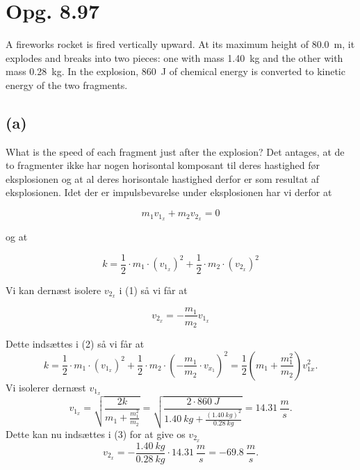 \documentclass[12pt]{article}
\begin{document}
\section*{Opg. 8.97}
A fireworks rocket is fired vertically upward. At its maximum height of \qty{80,0}{m}, it explodes and breaks into two pieces: one with mass \qty{1,40}{kg} and the other with mass \qty{0,28}{kg}. In the explosion, \qty{860}{J} of chemical energy is converted to kinetic energy of the two fragments.

\subsection*{(a)}
What is the speed of each fragment just after the explosion?
\bigbreak
Det antages, at de to fragmenter ikke har nogen horisontal komposant til deres hastighed før eksplosionen og at al deres horisontale hastighed derfor er som resultat af eksplosionen. Idet der er impulsbevarelse under eksplosionen har vi derfor at

\begin{equation}
m_1 v_{1_x} + m_2 v_{2_x} = 0
\end{equation}

og at

\begin{equation}
k = \frac{1}{2} \cdot m_1 \cdot \left( v_{1_x} \right)^2 + \frac{1}{2} \cdot m_2 \cdot \left( v_{2_x} \right)^2   
\end{equation}

Vi kan dernæst isolere $v_{2_x}$ i (1) så vi får at

\begin{equation}
v_{2_x} = -\frac{m_1}{m_2}v_{1_x}
\end{equation}

  Dette indsættes i (2) så vi får at
\[
k = \frac{1}{2} \cdot m_1 \cdot \left( v_{1_x} \right)^2 + \frac{1}{2} \cdot m_2 \cdot \left( -\frac{m_1}{m_2}\cdot v_{x_1} \right)^2  = \frac{1}{2}\left( m_1 + \frac{m_1^2}{m_2} \right) v_{1x}^2
.\] 
Vi isolerer dernæst $v_{1_x}$
\[
  v_{1_x} = \sqrt{\frac{2k}{m_1 + \frac{m_1^2}{m_2}}} = \sqrt{\frac{2\cdot \qty{860}{J}}{\qty{1,40}{kg} + \frac{\left( \qty{1,40}{kg} \right)^2}{\qty{0,28}{kg}}}} = \qty{14,31}{\frac{m}{s}} 
.\] 
Dette kan nu indsættes i (3) for at give os $v_{2_x}$ 
\[
v_{2_x} = - \frac{\qty{1,40}{kg}}{\qty{0,28}{kg}}\cdot \qty{14,31}{\frac{m}{s}} = \qty{-69,8}{\frac{m}{s}}
.\] 
\end{document}

